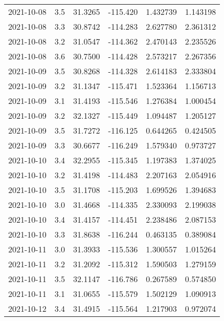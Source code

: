 \begin{tabular}{lrrrrr}
2021-10-08 &       3.5 &  31.3265 &  -115.420 &         1.432739 &         1.143198 \\
2021-10-08 &       3.3 &  30.8742 &  -114.283 &         2.627780 &         2.361312 \\
2021-10-08 &       3.2 &  31.0547 &  -114.362 &         2.470143 &         2.235526 \\
2021-10-08 &       3.6 &  30.7500 &  -114.428 &         2.573217 &         2.267356 \\
2021-10-09 &       3.5 &  30.8268 &  -114.328 &         2.614183 &         2.333804 \\
2021-10-09 &       3.2 &  31.1347 &  -115.471 &         1.523364 &         1.156713 \\
2021-10-09 &       3.1 &  31.4193 &  -115.546 &         1.276384 &         1.000454 \\
2021-10-09 &       3.2 &  32.1327 &  -115.449 &         1.094487 &         1.205127 \\
2021-10-09 &       3.5 &  31.7272 &  -116.125 &         0.644265 &         0.424505 \\
2021-10-09 &       3.3 &  30.6677 &  -116.249 &         1.579340 &         0.973727 \\
2021-10-10 &       3.4 &  32.2955 &  -115.345 &         1.197383 &         1.374025 \\
2021-10-10 &       3.2 &  31.4198 &  -114.483 &         2.207163 &         2.054916 \\
2021-10-10 &       3.5 &  31.1708 &  -115.203 &         1.699526 &         1.394683 \\
2021-10-10 &       3.0 &  31.4668 &  -114.335 &         2.330093 &         2.199038 \\
2021-10-10 &       3.4 &  31.4157 &  -114.451 &         2.238486 &         2.087153 \\
2021-10-10 &       3.3 &  31.8638 &  -116.244 &         0.463135 &         0.389084 \\
2021-10-11 &       3.0 &  31.3933 &  -115.536 &         1.300557 &         1.015264 \\
2021-10-11 &       3.2 &  31.2092 &  -115.312 &         1.590503 &         1.279159 \\
2021-10-11 &       3.5 &  32.1147 &  -116.786 &         0.267589 &         0.574850 \\
2021-10-11 &       3.1 &  31.0655 &  -115.579 &         1.502129 &         1.090913 \\
2021-10-12 &       3.4 &  31.4915 &  -115.564 &         1.217903 &         0.972074 \\

\end{tabular}
